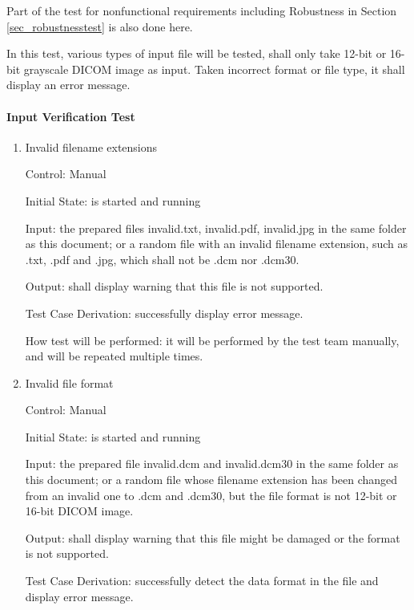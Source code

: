 \documentclass[12pt, titlepage]{article}
\begin{document}
Part of the test for nonfunctional requirements including Robustness in Section
\ref{sec_robustnesstest} is also done here.

In this test, various types of input file will be tested, \progname{} shall only
take 12-bit or 16-bit grayscale DICOM image as input. Taken incorrect format or
file type, it shall display an error message.
		
\paragraph{Input Verification Test}

\begin{enumerate}

\item{Invalid filename extensions}

Control: Manual
					
Initial State: \progname{} is started and running
					
Input: the prepared files invalid.txt, invalid.pdf, invalid.jpg in the same
folder as this document; or a random file with an invalid filename extension,
such as .txt, .pdf and .jpg, which shall not be .dcm nor .dcm30.
					
Output: \progname{} shall display warning that this file is not supported.

Test Case Derivation: successfully display error message.
					
How test will be performed: it will be performed by the test team manually, and
will be repeated multiple times. 
					
\item{Invalid file format}

Control: Manual
					
Initial State: \progname{} is started and running
					
Input: the prepared file invalid.dcm and invalid.dcm30 in the same folder as
this document; or a random file whose filename extension has been changed from
an invalid one to .dcm and .dcm30, but the file format is not 12-bit or 16-bit
DICOM image.
					
Output: \progname{} shall display warning that this file might be damaged or the
format is not supported.

Test Case Derivation: successfully detect the data format in the file and
display error message. 


\end{enumerate}
\end{document}
